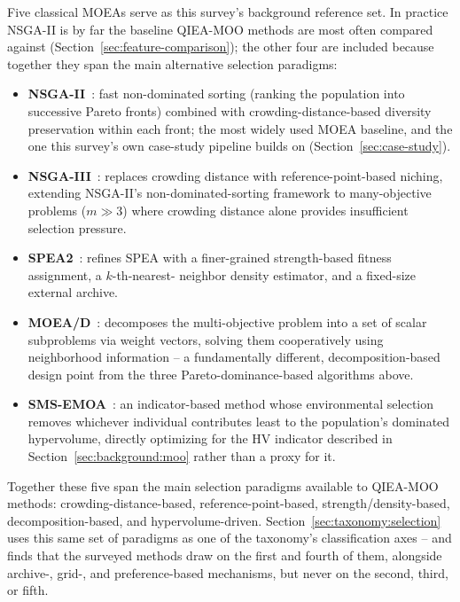 Five classical MOEAs serve as this survey's background reference set.
In practice NSGA-II is by far the baseline QIEA-MOO methods are most
often compared against (Section~\ref{sec:feature-comparison}); the
other four are included because together they span the main
alternative selection paradigms:
\begin{itemize}
  \item \textbf{NSGA-II}~\citep{deb2002nsga2}: fast non-dominated
    sorting (ranking the population into successive Pareto fronts) combined
    with crowding-distance-based diversity preservation within each
    front; the most widely used MOEA baseline, and the one this survey's
    own case-study pipeline builds on (Section~\ref{sec:case-study}).
  \item \textbf{NSGA-III}~\citep{debjain2014nsga3}: replaces
    crowding distance with reference-point-based niching, extending
    NSGA-II's non-dominated-sorting framework to many-objective problems
    ($m \gg 3$) where crowding distance alone provides insufficient
    selection pressure.
  \item \textbf{SPEA2}~\citep{zitzler2001spea2}: refines SPEA with a
    finer-grained strength-based fitness assignment, a $k$-th-nearest-
    neighbor density estimator, and a fixed-size external archive.
  \item \textbf{MOEA/D}~\citep{zhangli2007moead}: decomposes the
    multi-objective problem into a set of scalar subproblems via weight
    vectors, solving them cooperatively using neighborhood information --
    a fundamentally different, decomposition-based design point from the
    three Pareto-dominance-based algorithms above.
  \item \textbf{SMS-EMOA}~\citep{beume2007smsemoa}: an indicator-based
    method whose environmental selection removes whichever individual
    contributes least to the population's dominated hypervolume, directly
    optimizing for the HV indicator described in
    Section~\ref{sec:background:moo} rather than a proxy for it.
\end{itemize}
Together these five span the main selection paradigms available to
QIEA-MOO methods: crowding-distance-based, reference-point-based,
strength/density-based, decomposition-based, and hypervolume-driven.
Section~\ref{sec:taxonomy:selection} uses this same set of paradigms as
one of the taxonomy's classification axes -- and finds that the surveyed
methods draw on the first and fourth of them, alongside archive-, grid-,
and preference-based mechanisms, but never on the second, third, or
fifth.
